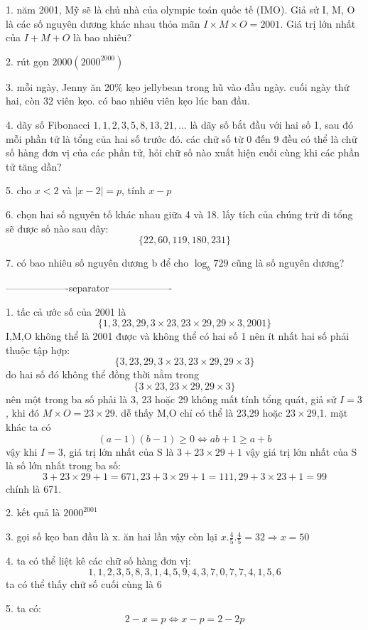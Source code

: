 \documentclass{article}
\begin{document}
1. năm 2001, Mỹ sẽ là chủ nhà của olympic toán quốc tế (IMO). 
Giả sử I, M, O là các số nguyên dương khác nhau thỏa mãn $I\times M \times O=2001$. 
Giá trị lớn nhất của $I+M+O$ là bao nhiêu?

2. rút gọn $2000(2000^{2000})$

3. mỗi ngày, Jenny ăn 20\% kẹo jellybean trong hũ vào đầu ngày. cuối ngày thứ hai, còn 32 viên kẹo.
có bao nhiêu viên kẹo lúc ban đầu.

4. dãy số Fibonacci $1,1,2,3,5,8,13,21,...$ là dãy số bắt đầu với hai số 1, sau đó mỗi phần tử là tổng của hai số trước đó.
các chữ số từ 0 đến 9 đều có thể là chữ số hàng đơn vị của các phần tử, hỏi chữ số nào xuất hiện cuối cùng khi các phần tử tăng dần?

5. cho $x<2$ và $|x-2|=p$, tính $x-p$

6. chọn hai số nguyên tố khác nhau giữa 4 và 18. lấy tích của chúng trừ đi tổng sẽ được số nào sau đây:
\[\{22,60,119,180,231\}\]

7. có bao nhiêu số nguyên dương b để cho $\log_{b}{729}$ cũng là số nguyên dương?

-------------------separator-------------------

1. tấc cả ước số của 2001 là
\[\{1, 3, 23, 29, 3\times 23, 23\times 29, 29\times 3, 2001\}\]
I,M,O không thể là 2001 được và không thể có hai số 1 nên ít nhất hai số phải thuộc tập hợp:
\[\{3, 23, 29, 3\times 23, 23\times 29, 29\times 3\}\]
do hai số đó không thể đồng thời nằm trong 
\[\{3\times 23, 23\times 29, 29\times 3\}\]
nên một trong ba số phải là 3, 23 hoặc 29
\newline
không mất tính tổng quát, giả sử $I=3$, khi đó $M\times O=23\times 29$.
dễ thấy M,O chỉ có thể là 23,29 hoặc $23\times 29$,1. mặt khác ta có
\[(a-1)(b-1)\geq 0 \Leftrightarrow ab+1 \geq a+b\]
vậy khi $I=3$, giá trị lớn nhất của S là $3+23\times 29 + 1$
vậy giá trị lớn nhất của S là số lớn nhất trong ba số:
\[3+23\times 29 + 1=671, 23 + 3 \times 29+1= 111, 29 + 3 \times 23+1=99\]
chính là 671.

2. kết quả là $2000^{2001}$

3. gọi số kẹo ban đầu là x. ăn hai lần vậy còn lại $x.\frac{4}{5}.\frac{4}{5}=32 \Rightarrow x=50$

4. ta có thể liệt kê các chữ số hàng đơn vị:
\[1,1,2,3,5,8,3,1,4,5,9,4,3,7,0,7,7,4,1,5,6\]
ta có thể thấy chữ số cuối cùng là 6

5. ta có:
\[2-x=p \Leftrightarrow x-p=2-2p\]
\end{document}
